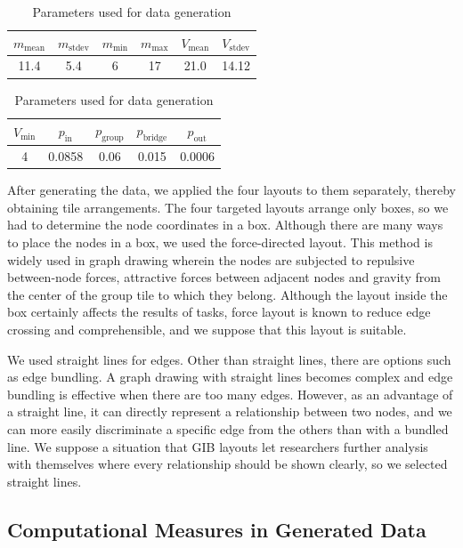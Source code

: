 \documentclass[review]{vgtc}                 %
\begin{document}
\begin{table}[b]
  \begin{center}
  \caption{Parameters used for data generation}
  \label{parameters}
    \begin{tabular}{|c|c|c|c|c|c|} \hline
      $m_{\text{mean}}$ & $m_{\text{stdev}}$ & $m_{\text{min}}$ & $m_{\text{max} }$ & $V_{\text{mean}}$ & $V_{\text{stdev}}$ \\ \hline 
      11.4 & 5.4 & 6 & 17 & 21.0 & 14.12 \\ \hline
    \end{tabular}
    \begin{tabular}{|c|c|c|c|c|} \hline
      $V_{\text{min}}$ & $p_{\text{in}}$ & $p_{\text{group}}$ & $p_{\text{bridge}}$ & $p_{\text{out}}$ \\ \hline
      4 & 0.0858 & 0.06 & 0.015 & 0.0006 \\ \hline
    \end{tabular}
  \end{center}
\end{table}

After generating the data, we applied the four layouts to them separately, thereby obtaining tile arrangements.
The four targeted layouts arrange only boxes, so we had to determine the node coordinates in a box.
Although there are many ways to place the nodes in a box, we used the force-directed layout.
This method is widely used in graph drawing wherein the nodes are subjected to repulsive between-node forces, attractive forces between adjacent nodes and gravity from the center of the group tile to which they belong.
Although the layout inside the box certainly affects the results of tasks, force layout is known to reduce edge crossing and comprehensible, and we suppose that this layout is suitable.

We used straight lines for edges.
Other than straight lines, there are options such as edge bundling.
A graph drawing with straight lines becomes complex and edge bundling is effective when there are too many edges.
However, as an advantage of a straight line, it can directly represent a relationship between two nodes, and we can more easily discriminate a specific edge from the others than with a bundled line.
We suppose a situation that GIB layouts let researchers further analysis with themselves where every relationship should be shown clearly, so we selected straight lines.


\subsection{Computational Measures in Generated Data}
\label{computation}
\end{document}
